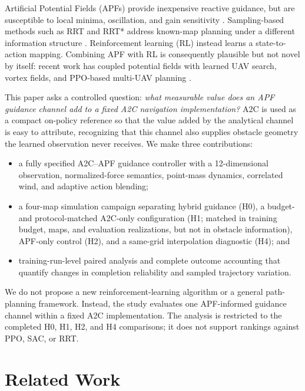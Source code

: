 \documentclass[conference]{IEEEtran}
\begin{document}
Artificial Potential Fields (APFs) provide inexpensive reactive guidance, but are susceptible to local minima, oscillation, and gain sensitivity \cite{khatib1986real}. Sampling-based methods such as RRT and RRT* address known-map planning under a different information structure \cite{lavalle1998rrt,karaman2011sampling}. Reinforcement learning (RL) instead learns a state-to-action mapping. Combining APF with RL is consequently plausible but not novel by itself: recent work has coupled potential fields with learned UAV search, vortex fields, and PPO-based multi-UAV planning \cite{jin2025hybrid,xiao2025vapf,lee2025apfppo}.

This paper asks a controlled question: \emph{what measurable value does an APF guidance channel add to a fixed A2C navigation implementation?} A2C is used as a compact on-policy reference so that the value added by the analytical channel is easy to attribute, recognizing that this channel also supplies obstacle geometry the learned observation never receives. We make three contributions:
\begin{itemize}
\item a fully specified A2C--APF guidance controller with a 12-dimensional observation, normalized-force semantics, point-mass dynamics, correlated wind, and adaptive action blending;
\item a four-map simulation campaign separating hybrid guidance (H0), a budget- and protocol-matched A2C-only configuration (H1; matched in training budget, maps, and evaluation realizations, but not in obstacle information), APF-only control (H2), and a same-grid interpolation diagnostic (H4); and
\item training-run-level paired analysis and complete outcome accounting that quantify changes in completion reliability and sampled trajectory variation.
\end{itemize}
We do not propose a new reinforcement-learning algorithm or a general path-planning framework. Instead, the study evaluates one APF-informed guidance channel within a fixed A2C implementation. The analysis is restricted to the completed H0, H1, H2, and H4 comparisons; it does not support rankings against PPO, SAC, or RRT.

\section{Related Work}
\end{document}
